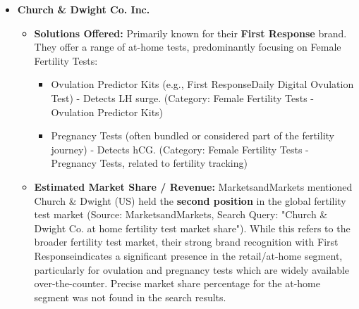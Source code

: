 \documentclass{article}
\begin{document}
\begin{itemize}[label=\textbullet]

    \item \textbf{Church \& Dwight Co. Inc.}
    \begin{itemize}[label=--]
        \item \textbf{Solutions Offered:} Primarily known for their \textbf{First Response\texttrademark} brand. They offer a range of at-home tests, predominantly focusing on Female Fertility Tests:
        \begin{itemize}[label=$\circ$]
            \item Ovulation Predictor Kits (e.g., First Response\texttrademark Daily Digital Ovulation Test) - Detects LH surge. (Category: Female Fertility Tests - Ovulation Predictor Kits)
            \item Pregnancy Tests (often bundled or considered part of the fertility journey) - Detects hCG. (Category: Female Fertility Tests - Pregnancy Tests, related to fertility tracking)
        \end{itemize}
        \item \textbf{Estimated Market Share / Revenue:} MarketsandMarkets mentioned Church \& Dwight (US) held the \textbf{second position} in the global fertility test market (Source: MarketsandMarkets, Search Query: "Church & Dwight Co. at home fertility test market share"). While this refers to the broader fertility test market, their strong brand recognition with First Response\texttrademark indicates a significant presence in the retail/at-home segment, particularly for ovulation and pregnancy tests which are widely available over-the-counter. Precise market share percentage for the at-home segment was not found in the search results.
    \end{itemize}
    \vspace{0.5em} %


\end{itemize}
\end{document}
